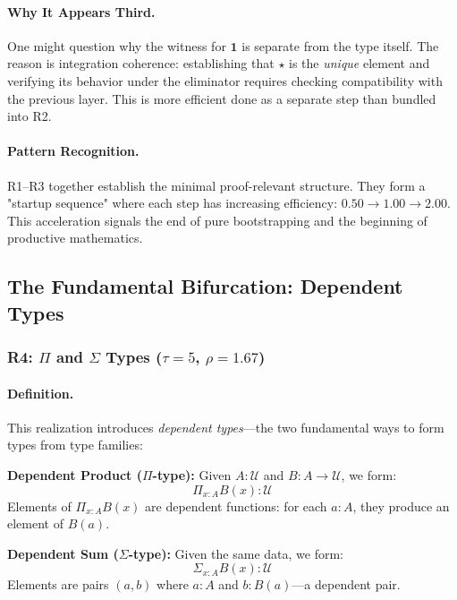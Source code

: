 \documentclass[11pt]{article}
\theoremstyle{definition}
\begin{document}
\paragraph{Why It Appears Third.}
One might question why the witness for $\mathbf{1}$ is separate from the type itself. The reason is integration coherence: establishing that $\star$ is the \emph{unique} element and verifying its behavior under the eliminator requires checking compatibility with the previous layer. This is more efficient done as a separate step than bundled into R2.

\paragraph{Pattern Recognition.}
R1--R3 together establish the minimal proof-relevant structure. They form a "startup sequence" where each step has increasing efficiency: $0.50 \to 1.00 \to 2.00$. This acceleration signals the end of pure bootstrapping and the beginning of productive mathematics.

\subsection{The Fundamental Bifurcation: Dependent Types}

\subsubsection{R4: $\Pi$ and $\Sigma$ Types ($\tau=5$, $\rho=1.67$)}

\paragraph{Definition.}
This realization introduces \emph{dependent types}—the two fundamental ways to form types from type families:

\textbf{Dependent Product ($\Pi$-type):}
Given $A : \mathcal{U}$ and $B : A \to \mathcal{U}$, we form:
\[
\Pi_{x:A} B(x) : \mathcal{U}
\]
Elements of $\Pi_{x:A} B(x)$ are dependent functions: for each $a : A$, they produce an element of $B(a)$.

\textbf{Dependent Sum ($\Sigma$-type):}
Given the same data, we form:
\[
\Sigma_{x:A} B(x) : \mathcal{U}
\]
Elements are pairs $(a, b)$ where $a : A$ and $b : B(a)$—a dependent pair.
\end{document}
